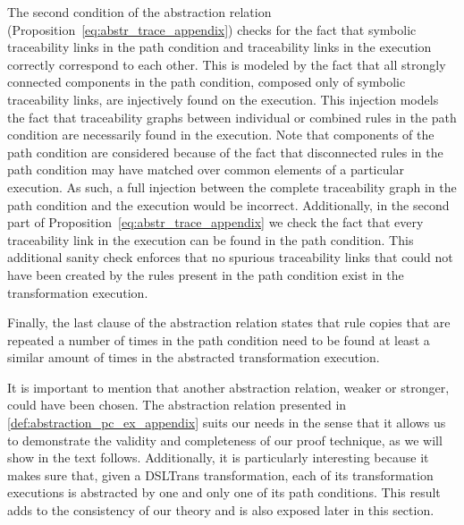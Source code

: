 The second condition of the abstraction relation
(Proposition~\ref{eq:abstr_trace_appendix}) checks for the fact that symbolic
traceability links in the path condition and traceability links in the execution
correctly correspond to each other. This is modeled by the fact that all
strongly connected components in the path condition, composed only of symbolic
traceability links, are injectively found on the execution. This injection
models the fact that traceability graphs between individual or combined rules in
the path condition are necessarily found in the execution. Note that components
of the path condition are considered because of the fact that disconnected rules
in the path condition may have matched over common elements of a particular
execution. As such, a full injection between the complete traceability graph in
the path condition and the execution would be incorrect. Additionally, in the
second part of Proposition~\ref{eq:abstr_trace_appendix} we check the fact that every
traceability link in the execution can be found in the path condition. This
additional sanity check enforces that no spurious traceability links that could
not have been created by the rules present in the path condition exist in the
transformation execution.

Finally, the last clause of the abstraction relation states that rule copies
that are repeated a number of times in the path condition need to be found at
least a similar amount of times in the abstracted transformation execution.

It is important to mention that another abstraction relation, weaker or
stronger, could have been chosen. The abstraction relation presented in
\cref{def:abstraction_pc_ex_appendix} suits our needs in the sense that it allows us to
demonstrate the validity and completeness of our proof technique, as we will
show in the text follows. Additionally, it is particularly interesting because
it makes sure that, given a DSLTrans transformation, each of its transformation
executions is abstracted by one and only one of its path conditions. This result
adds to the consistency of our theory and is also exposed later in this section.

